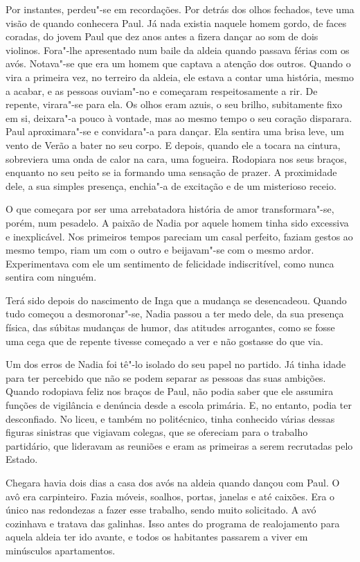 Por instantes, perdeu"-se em recordações. Por detrás dos olhos fechados,
teve uma visão de quando conhecera Paul. Já nada existia naquele homem
gordo, de faces coradas, do jovem Paul que dez anos antes a fizera
dançar ao som de dois violinos. Fora"-lhe apresentado num baile da aldeia
quando passava férias com os avós. Notava"-se que era um homem que
captava a atenção dos outros. Quando o vira a primeira vez, no terreiro
da aldeia, ele estava a contar
uma história, mesmo a acabar, e as pessoas ouviam"-no e começaram
respeitosamente a rir. De repente, virara"-se para ela. Os olhos eram
azuis, o seu brilho, subitamente fixo em si, deixara"-a pouco à vontade,
mas ao mesmo tempo o seu coração disparara. Paul aproximara"-se e
convidara"-a para dançar. Ela sentira uma brisa leve, um vento de Verão a
bater no seu corpo. E depois, quando ele a tocara na cintura, sobreviera
uma onda de calor na cara, uma fogueira. Rodopiara nos seus braços,
enquanto no seu peito se ia formando uma sensação de prazer. A proximidade dele, a sua simples presença, enchia"-a de excitação e de um
misterioso receio.

O que começara por ser uma arrebatadora história de amor
transformara"-se, porém, num pesadelo. A paixão de Nadia por aquele homem
tinha sido excessiva e inexplicável. Nos primeiros tempos pareciam um
casal perfeito, faziam gestos ao mesmo tempo, riam um com o outro e
beijavam"-se com o mesmo ardor. Experimentava com ele um sentimento de
felicidade indiscritível, como nunca sentira com ninguém.

Terá sido depois do nascimento de Inga que a mudança se desencadeou.
Quando tudo começou a desmoronar"-se, Nadia passou a ter medo dele, da
sua presença física, das súbitas mudanças de humor, das atitudes
arrogantes, como se fosse uma cega que de repente tivesse começado a ver
e não gostasse do que via.

Um dos erros de Nadia foi tê"-lo isolado do seu papel no partido. Já
tinha idade para ter percebido que não se podem separar as pessoas das
suas ambições. Quando rodopiava feliz nos braços de Paul, não podia
saber que ele assumira funções de vigilância e denúncia desde a escola primária.
E, no entanto, podia ter desconfiado. No liceu, e também no politécnico,
tinha conhecido várias dessas figuras sinistras que vigiavam colegas,
que se ofereciam para o trabalho partidário, que lideravam as reuniões
e eram as primeiras a serem recrutadas pelo Estado.

Chegara havia dois dias a casa dos avós na aldeia quando dançou com
Paul. O avô era carpinteiro. Fazia móveis, soalhos, portas, janelas e
até caixões. Era o único nas redondezas a fazer esse trabalho, sendo
muito solicitado. A avó cozinhava e tratava das galinhas. Isso antes
do programa de realojamento para aquela aldeia ter ido avante, e todos
os habitantes passarem a viver em minúsculos apartamentos.

